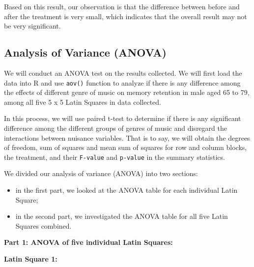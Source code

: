 \documentclass[]{article}
\providecommand{\tightlist}{%
  \setlength{\itemsep}{0pt}\setlength{\parskip}{0pt}}
\begin{document}
Based on this result, our observation is that the difference between
before and after the treatment is very small, which indicates that the
overall result may not be very significant.

\subsection{Analysis of Variance
(ANOVA)}\label{analysis-of-variance-anova}

We will conduct an ANOVA test on the results collected. We will first
load the data into R and use \texttt{aov()} function to analyze if there
is any difference among the effects of different genre of music on
memory retention in male aged 65 to 79, among all five 5 x 5 Latin
Squares in data collected.

In this process, we will use paired t-test to determine if there is any
significant difference among the different groups of genres of music and
disregard the interactions between nuisance variables. That is to say,
we will obtain the degrees of freedom, sum of squares and mean sum of
squares for row and column blocks, the treatment, and their
\texttt{F-value} and \texttt{p-value} in the summary statistics.

We divided our analysis of variance (ANOVA) into two sections:

\begin{itemize}
\tightlist
\item
  in the first part, we looked at the ANOVA table for each individual
  Latin Square;
\item
  in the second part, we investigated the ANOVA table for all five Latin
  Squares combined.
\end{itemize}

\textbf{Part 1: ANOVA of five individual Latin Squares:}

\textbf{Latin Square 1:}
\end{document}
